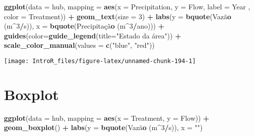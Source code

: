 \documentclass[
]{book}
\newenvironment{Shaded}{\begin{snugshade}}{\end{snugshade}}
\newcommand{\DataTypeTok}[1]{\textcolor[rgb]{0.13,0.29,0.53}{#1}}
\newcommand{\DecValTok}[1]{\textcolor[rgb]{0.00,0.00,0.81}{#1}}
\newcommand{\KeywordTok}[1]{\textcolor[rgb]{0.13,0.29,0.53}{\textbf{#1}}}
\newcommand{\NormalTok}[1]{#1}
\newcommand{\OperatorTok}[1]{\textcolor[rgb]{0.81,0.36,0.00}{\textbf{#1}}}
\newcommand{\StringTok}[1]{\textcolor[rgb]{0.31,0.60,0.02}{#1}}
\begin{document}
\begin{Shaded}
\begin{Highlighting}[]
\KeywordTok{ggplot}\NormalTok{(}\DataTypeTok{data =}\NormalTok{ hub, }\DataTypeTok{mapping =} \KeywordTok{aes}\NormalTok{(}\DataTypeTok{x =}\NormalTok{ Precipitation, }\DataTypeTok{y =}\NormalTok{ Flow, }\DataTypeTok{label =}\NormalTok{ Year}
\NormalTok{                                 , }\DataTypeTok{color =}\NormalTok{ Treatment)) }\OperatorTok{+}
\StringTok{  }\KeywordTok{geom_text}\NormalTok{(}\DataTypeTok{size =} \DecValTok{3}\NormalTok{) }\OperatorTok{+}
\StringTok{  }\KeywordTok{labs}\NormalTok{(}\DataTypeTok{y =} \KeywordTok{bquote}\NormalTok{(Vazã}\KeywordTok{o}\NormalTok{ (m}\OperatorTok{^}\DecValTok{3}\OperatorTok{/}\NormalTok{s)),}
       \DataTypeTok{x =} \KeywordTok{bquote}\NormalTok{(Precipitaçã}\KeywordTok{o}\NormalTok{ (m}\OperatorTok{^}\DecValTok{3}\OperatorTok{/}\NormalTok{ano))) }\OperatorTok{+}
\StringTok{  }\KeywordTok{guides}\NormalTok{(}\DataTypeTok{color=}\KeywordTok{guide_legend}\NormalTok{(}\DataTypeTok{title=}\StringTok{"Estado da área"}\NormalTok{)) }\OperatorTok{+}
\StringTok{  }\KeywordTok{scale_color_manual}\NormalTok{(}\DataTypeTok{values =} \KeywordTok{c}\NormalTok{(}\StringTok{"blue"}\NormalTok{, }\StringTok{"red"}\NormalTok{))}
\end{Highlighting}
\end{Shaded}

\begin{center}\texttt{[image: IntroR\_files/figure-latex/unnamed-chunk-194-1]} \end{center}

\hypertarget{boxplot-2}{%
\section{Boxplot}\label{boxplot-2}}

\begin{Shaded}
\begin{Highlighting}[]
\KeywordTok{ggplot}\NormalTok{(}\DataTypeTok{data =}\NormalTok{ hub, }\DataTypeTok{mapping =} \KeywordTok{aes}\NormalTok{(}\DataTypeTok{x =}\NormalTok{ Treatment, }\DataTypeTok{y =}\NormalTok{ Flow)) }\OperatorTok{+}
\StringTok{  }\KeywordTok{geom_boxplot}\NormalTok{() }\OperatorTok{+}
\StringTok{  }\KeywordTok{labs}\NormalTok{(}\DataTypeTok{y =} \KeywordTok{bquote}\NormalTok{(Vazã}\KeywordTok{o}\NormalTok{ (m}\OperatorTok{^}\DecValTok{3}\OperatorTok{/}\NormalTok{s)),}
       \DataTypeTok{x =} \StringTok{""}\NormalTok{)}
\end{Highlighting}
\end{Shaded}
\end{document}
